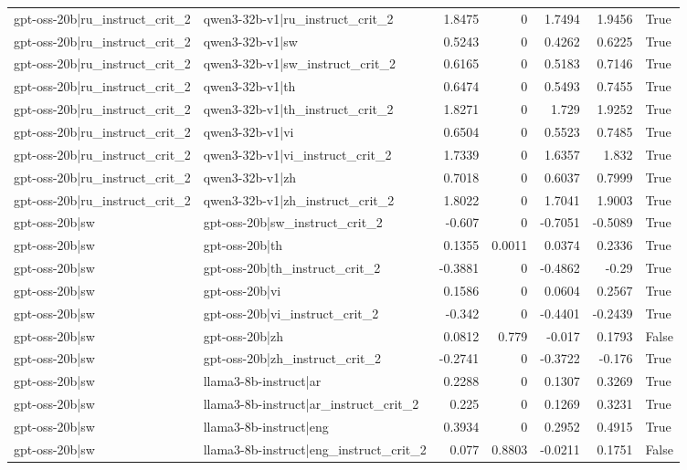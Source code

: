 \begin{table}
\begin{tabular}{l l r r r r l}
gpt-oss-20b|ru_instruct_crit_2 & qwen3-32b-v1|ru_instruct_crit_2 & 1.8475 & 0 & 1.7494 & 1.9456 & True \\
gpt-oss-20b|ru_instruct_crit_2 & qwen3-32b-v1|sw & 0.5243 & 0 & 0.4262 & 0.6225 & True \\
gpt-oss-20b|ru_instruct_crit_2 & qwen3-32b-v1|sw_instruct_crit_2 & 0.6165 & 0 & 0.5183 & 0.7146 & True \\
gpt-oss-20b|ru_instruct_crit_2 & qwen3-32b-v1|th & 0.6474 & 0 & 0.5493 & 0.7455 & True \\
gpt-oss-20b|ru_instruct_crit_2 & qwen3-32b-v1|th_instruct_crit_2 & 1.8271 & 0 & 1.729 & 1.9252 & True \\
gpt-oss-20b|ru_instruct_crit_2 & qwen3-32b-v1|vi & 0.6504 & 0 & 0.5523 & 0.7485 & True \\
gpt-oss-20b|ru_instruct_crit_2 & qwen3-32b-v1|vi_instruct_crit_2 & 1.7339 & 0 & 1.6357 & 1.832 & True \\
gpt-oss-20b|ru_instruct_crit_2 & qwen3-32b-v1|zh & 0.7018 & 0 & 0.6037 & 0.7999 & True \\
gpt-oss-20b|ru_instruct_crit_2 & qwen3-32b-v1|zh_instruct_crit_2 & 1.8022 & 0 & 1.7041 & 1.9003 & True \\
gpt-oss-20b|sw & gpt-oss-20b|sw_instruct_crit_2 & -0.607 & 0 & -0.7051 & -0.5089 & True \\
gpt-oss-20b|sw & gpt-oss-20b|th & 0.1355 & 0.0011 & 0.0374 & 0.2336 & True \\
gpt-oss-20b|sw & gpt-oss-20b|th_instruct_crit_2 & -0.3881 & 0 & -0.4862 & -0.29 & True \\
gpt-oss-20b|sw & gpt-oss-20b|vi & 0.1586 & 0 & 0.0604 & 0.2567 & True \\
gpt-oss-20b|sw & gpt-oss-20b|vi_instruct_crit_2 & -0.342 & 0 & -0.4401 & -0.2439 & True \\
gpt-oss-20b|sw & gpt-oss-20b|zh & 0.0812 & 0.779 & -0.017 & 0.1793 & False \\
gpt-oss-20b|sw & gpt-oss-20b|zh_instruct_crit_2 & -0.2741 & 0 & -0.3722 & -0.176 & True \\
gpt-oss-20b|sw & llama3-8b-instruct|ar & 0.2288 & 0 & 0.1307 & 0.3269 & True \\
gpt-oss-20b|sw & llama3-8b-instruct|ar_instruct_crit_2 & 0.225 & 0 & 0.1269 & 0.3231 & True \\
gpt-oss-20b|sw & llama3-8b-instruct|eng & 0.3934 & 0 & 0.2952 & 0.4915 & True \\
gpt-oss-20b|sw & llama3-8b-instruct|eng_instruct_crit_2 & 0.077 & 0.8803 & -0.0211 & 0.1751 & False \\

\end{tabular}
\end{table}
